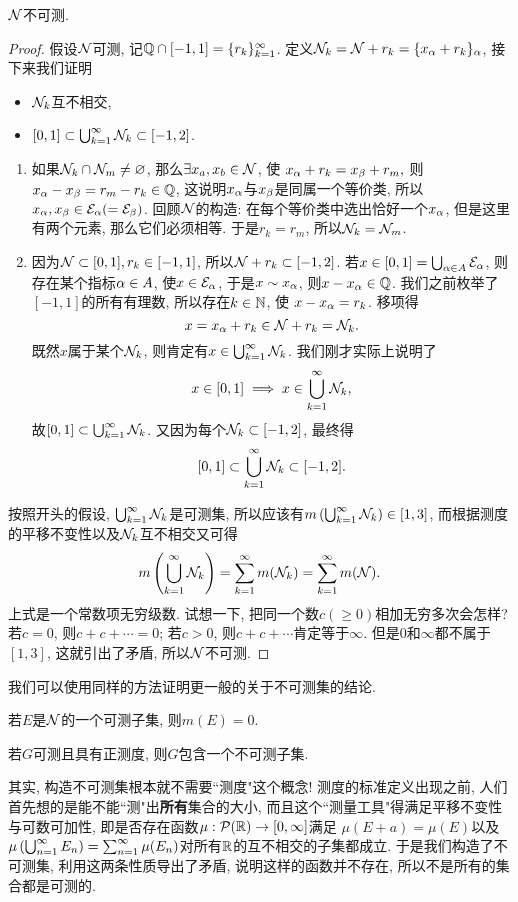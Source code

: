 \begin{theorem}
    $\mathcal{N}$不可测.
\end{theorem}
\begin{proof}
    假设$\mathcal{N}$可测, 记$\mathbb{Q} \cap [-1,1]=\{r_k\}_{k=1}^\infty$.
    定义$\mathcal{N}_k = \mathcal{N} + r_k = \{x_\alpha + r_k\}_\alpha$, 接下来我们证明
    \begin{itemize}
    \item $\mathcal{N}_k$互不相交, 
    \item $[0,1] \subset \bigcup_{k=1}^{\infty}\mathcal{N}_k \subset [-1,2]$. 
    \end{itemize}
    \begin{enumerate}
    \item 如果$\mathcal{N}_k \cap \mathcal{N}_m \neq \varnothing$, 
    那么$\exists x_a, x_b \in \mathcal{N}$, 使
    $x_\alpha + r_k = x_\beta + r_m,$
    则$x_\alpha-x_\beta = r_m - r_k \in \mathbb{Q}$, 这说明$x_\alpha$与$x_\beta$是同属一个等价类, 所以$x_\alpha, x_\beta \in \mathcal{E}_\alpha (=\mathcal{E}_\beta)$. 
    回顾$\mathcal{N}$的构造: 在每个等价类中选出恰好一个$x_\alpha$, 但是这里有两个元素, 那么它们必须相等. 于是$r_k=r_m$, 所以$\mathcal{N}_k = \mathcal{N}_m$. 
    \item 因为$\mathcal{N} \subset [0,1], r_k \in [-1,1]$, 所以$\mathcal{N}+r_k \subset [-1,2]$. 
    若$x \in [0,1] = \bigcup_{\alpha \in A}\mathcal{E}_\alpha$, 则存在某个指标$\alpha \in A$, 使$x \in \mathcal{E}_\alpha$, 于是$x \sim x_\alpha$, 则$x-x_\alpha \in \mathbb{Q}$. 我们之前枚举了$[-1,1]$的所有有理数, 所以存在$k \in \mathbb{N}$, 使
    $x-x_\alpha = r_k$. 移项得
    $$x = x_\alpha + r_k \in \mathcal{N} + r_k = \mathcal{N}_k.$$ 
    既然$x$属于某个$\mathcal{N}_k$, 则肯定有$x \in \bigcup_{k=1}^{\infty}\mathcal{N}_k$. 我们刚才实际上说明了
    $$x \in [0,1] \implies x \in \bigcup_{k=1}^{\infty}\mathcal{N}_k,$$
    故$[0,1] \subset \bigcup_{k=1}^{\infty}\mathcal{N}_k$.
    又因为每个$\mathcal{N}_k \subset [-1,2]$, 最终得
    $$[0,1] \subset \bigcup_{k=1}^{\infty}\mathcal{N}_k \subset [-1,2].$$
    \end{enumerate}
    按照开头的假设, $\bigcup_{k=1}^{\infty}\mathcal{N}_k$是可测集, 所以应该有$m\left(\bigcup_{k=1}^{\infty}\mathcal{N}_k\right) \in [1,3]$, 而根据测度的平移不变性以及$\mathcal{N}_k$互不相交又可得
    $$m\left(\bigcup_{k=1}^{\infty}\mathcal{N}_k\right)
    = \sum_{k=1}^{\infty}m(\mathcal{N}_k) = \sum_{k=1}^{\infty}m(\mathcal{N}).$$
    上式是一个常数项无穷级数. 试想一下, 把同一个数$c(\geq 0)$相加无穷多次会怎样? 若$c=0$, 则$c+c+\cdots = 0$; 若$c>0$, 则$c+c+\cdots$肯定等于$\infty$. 但是$0$和$\infty$都不属于$[1,3]$, 这就引出了矛盾, 所以$\mathcal{N}$不可测. 
\end{proof}

我们可以使用同样的方法证明更一般的关于不可测集的结论.
\begin{exercise} %
    若$E$是$\mathcal{N}$的一个可测子集, 则$m(E) = 0$. 
\end{exercise}
\begin{exercise} %
    若$G$可测且具有正测度, 则$G$包含一个不可测子集.
\end{exercise}

其实, 构造不可测集根本就不需要``测度"这个概念! 测度的标准定义出现之前, 人们首先想的是能不能``测"出\textbf{所有}集合的大小, 而且这个``测量工具"得满足平移不变性与可数可加性, 即是否存在函数$\mu: \mathcal{P}(\mathbb{R}) \to [0,\infty]$满足
$\mu(E+a) = \mu(E)$以及$\mu\left(\bigcup_{n=1}^{\infty}E_n\right) = \sum_{n=1}^{\infty}\mu(E_n)$对所有$\mathbb{R}$的互不相交的子集都成立. 于是我们构造了不可测集, 利用这两条性质导出了矛盾, 说明这样的函数并不存在, 所以不是所有的集合都是可测的. 